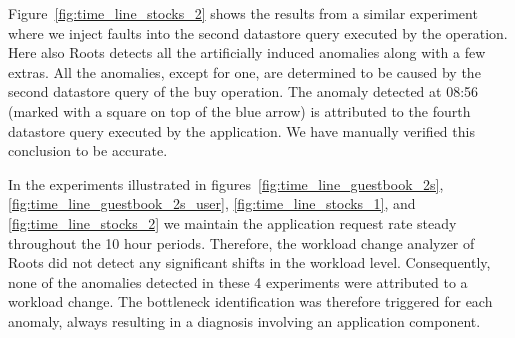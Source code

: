 Figure~\ref{fig:time_line_stocks_2} shows the results from a similar experiment where we inject
faults into the second datastore query executed by the operation. Here also Roots detects all the
artificially induced anomalies along with a few extras. All the anomalies, except for one, 
are determined to be caused by the second
datastore query of the buy operation. The anomaly detected at 08:56 (marked with a square on top of the blue arrow) 
is attributed to the fourth datastore query executed by the application. We have manually verified this
conclusion to be accurate. 

In the experiments illustrated in figures~\ref{fig:time_line_guestbook_2s}, \ref{fig:time_line_guestbook_2s_user}, 
\ref{fig:time_line_stocks_1}, and \ref{fig:time_line_stocks_2} we maintain
the application request rate steady throughout the 10 hour periods. Therefore,
the workload change analyzer of Roots did not detect any significant shifts in the workload level. 
Consequently, none of the anomalies detected in these 4 experiments were attributed to a workload change.
The bottleneck identification was therefore triggered for each anomaly, always resulting in a diagnosis
involving an application component.



